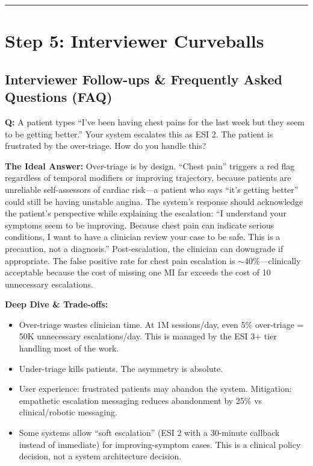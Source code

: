 \bigskip\hrule\bigskip

\section*{Step 5: Interviewer Curveballs}

\subsection*{Interviewer Follow-ups \& Frequently Asked Questions (FAQ)}

\textbf{Q:} A patient types ``I've been having chest pains for the last week but they seem to be getting better.'' Your system escalates this as ESI 2. The patient is frustrated by the over-triage. How do you handle this?

\textbf{The Ideal Answer:} Over-triage is by design. ``Chest pain'' triggers a red flag regardless of temporal modifiers or improving trajectory, because patients are unreliable self-assessors of cardiac risk---a patient who says ``it's getting better'' could still be having unstable angina. The system's response should acknowledge the patient's perspective while explaining the escalation: ``I understand your symptoms seem to be improving. Because chest pain can indicate serious conditions, I want to have a clinician review your case to be safe. This is a precaution, not a diagnosis.'' Post-escalation, the clinician can downgrade if appropriate. The false positive rate for chest pain escalation is $\sim$40\%---clinically acceptable because the cost of missing one MI far exceeds the cost of 10 unnecessary escalations.

\textbf{Deep Dive \& Trade-offs:}
\begin{itemize}
  \item Over-triage wastes clinician time. At 1M sessions/day, even 5\% over-triage = 50K unnecessary escalations/day. This is managed by the ESI 3+ tier handling most of the work.
  \item Under-triage kills patients. The asymmetry is absolute.
  \item User experience: frustrated patients may abandon the system. Mitigation: empathetic escalation messaging reduces abandonment by 25\% vs clinical/robotic messaging.
  \item Some systems allow ``soft escalation'' (ESI 2 with a 30-minute callback instead of immediate) for improving-symptom cases. This is a clinical policy decision, not a system architecture decision.
\end{itemize}

